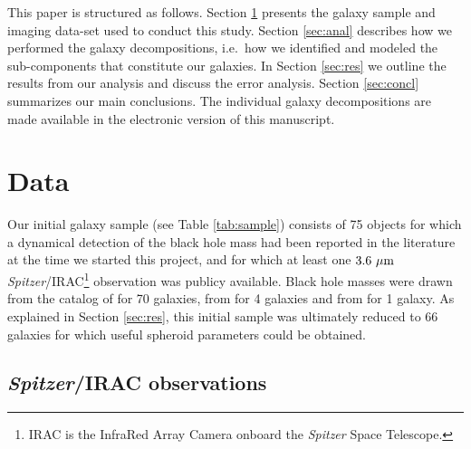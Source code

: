 \documentclass[preprint2]{emulateapj}
\begin{document}
This paper is structured as follows.
Section \ref{sec:data} presents the galaxy sample and imaging data-set used to conduct this study. 
Section \ref{sec:anal} describes how we performed the galaxy decompositions, 
i.e.~how we identified and modeled the sub-components that constitute our galaxies. 
In Section \ref{sec:res} we outline the results from our analysis and discuss the error analysis. 
Section \ref{sec:concl} summarizes our main conclusions. 
The individual galaxy decompositions are made available in the electronic version of this manuscript.


\section{Data}
\label{sec:data}
Our initial galaxy sample (see Table \ref{tab:sample}) consists of 75 objects for which a dynamical detection of the black hole mass 
had been reported in the literature at the time we started this project, 
and for which at least one $3.6~\rm \mu m$ \emph{Spitzer}/IRAC\footnote{IRAC is the InfraRed Array Camera onboard the \emph{Spitzer} Space Telescope.} 
observation was publicy available.
Black hole masses were drawn from the catalog of \citet{grahamscott2013} for 70 galaxies,
from \citet{rusli2013bhmassesDM} for 4 galaxies and from \citet{greenhill2003} for 1 galaxy. 
As explained in Section \ref{sec:res}, 
this initial sample was ultimately reduced to 66 galaxies for which useful spheroid parameters could be obtained.


%



\subsection{\emph{Spitzer}/IRAC observations}
\end{document}

